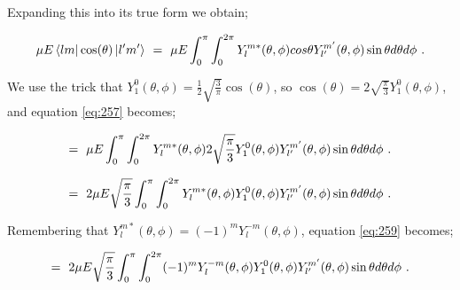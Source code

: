 \documentclass{article}
\begin{document}
Expanding this into its true form we obtain; 

\begin{equation} \label{eq:257}
\mu E\bra{l m}\cos(\theta)\ket{l' m'} \hspace{0.125cm} = \hspace{0.125cm} \mu E \int_{0}^{\pi} \int_{0}^{2\pi} Y_{l}^{m \ast}(\theta, \phi) cos\theta Y_{l'}^{m'}(\theta, \phi) \sin\theta d\theta d\phi \hspace{0.125cm} . 
\end{equation}

We use the trick that \begin{math} Y_{1}^{0}(\theta, \phi)  = \frac{1}{2}\sqrt{\frac{3}{\pi}}\cos(\theta) \end{math}, so \begin{math} \cos(\theta) = {2}\sqrt{\frac{\pi}{3}} Y_{1}^{0}(\theta, \phi)  \end{math}, and equation \ref{eq:257} becomes; 

\begin{equation} \label{eq:258}
= \hspace{0.125cm} \mu E \int_{0}^{\pi} \int_{0}^{2\pi} Y_{l}^{m \ast}(\theta, \phi) {2}\sqrt{\frac{\pi}{3}} Y_{1}^{0}(\theta, \phi) Y_{l'}^{m'}(\theta, \phi) \sin\theta d\theta d\phi \hspace{0.125cm} . 
\end{equation}

\begin{equation} \label{eq:259}
= \hspace{0.125cm} 2 \mu E \sqrt{\frac{\pi}{3}} \int_{0}^{\pi} \int_{0}^{2\pi} Y_{l}^{m \ast}(\theta, \phi) Y_{1}^{0}(\theta, \phi) Y_{l'}^{m'}(\theta, \phi) \sin\theta d\theta d\phi \hspace{0.125cm} . 
\end{equation}

Remembering that \begin{math} Y_{l}^{m \ast}(\theta, \phi)  =  (-1)^{m} Y_{l}^{-m}(\theta, \phi)  \end{math}, equation \ref{eq:259} becomes;

\begin{equation} \label{eq:260}
= \hspace{0.125cm} 2 \mu E \sqrt{\frac{\pi}{3}} \int_{0}^{\pi} \int_{0}^{2\pi} (-1)^{m} Y_{l}^{-m}(\theta, \phi) Y_{1}^{0}(\theta, \phi) Y_{l'}^{m'}(\theta, \phi) \sin\theta d\theta d\phi \hspace{0.125cm} . 
\end{equation}
\end{document}

